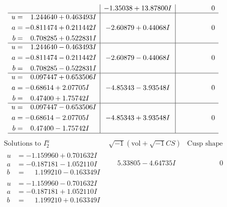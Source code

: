 \documentclass[1p]{elsarticle_modified}
\theoremstyle{definition}
\newcommand{\I}{\sqrt{-1}}
\begin{document}
$$\begin{array}{c|c|c}
 & -1.35038 + 13.87800 I & \phantom{-0.000000 } 0 \\ \hline\begin{aligned}
u &= \phantom{-}1.244640 + 0.463493 I \\
a &= -0.811474 + 0.211442 I \\
b &= \phantom{-}0.708285 + 0.522831 I\end{aligned}
 & -2.60879 + 0.44068 I & \phantom{-0.000000 } 0 \\ \hline\begin{aligned}
u &= \phantom{-}1.244640 - 0.463493 I \\
a &= -0.811474 - 0.211442 I \\
b &= \phantom{-}0.708285 - 0.522831 I\end{aligned}
 & -2.60879 - 0.44068 I & \phantom{-0.000000 } 0 \\ \hline\begin{aligned}
u &= \phantom{-}0.097447 + 0.653506 I \\
a &= -0.68614 + 2.07705 I \\
b &= \phantom{-}0.47400 + 1.75742 I\end{aligned}
 & -4.85343 - 3.93548 I & \phantom{-0.000000 } 0 \\ \hline\begin{aligned}
u &= \phantom{-}0.097447 - 0.653506 I \\
a &= -0.68614 - 2.07705 I \\
b &= \phantom{-}0.47400 - 1.75742 I\end{aligned}
 & -4.85343 + 3.93548 I & \phantom{-0.000000 } 0\\
 \hline 
 \end{array}$$\newpage$$\begin{array}{c|c|c}  
\text{Solutions to }I^u_{2}& \I (\text{vol} + \sqrt{-1}CS) & \text{Cusp shape}\\
 \hline 
\begin{aligned}
u &= -1.159960 + 0.701632 I \\
a &= -0.187181 - 1.052110 I \\
b &= \phantom{-}1.199210 - 0.163349 I\end{aligned}
 & \phantom{-}5.33805 - 4.64735 I & \phantom{-0.000000 } 0 \\ \hline\begin{aligned}
u &= -1.159960 - 0.701632 I \\
a &= -0.187181 + 1.052110 I \\
b &= \phantom{-}1.199210 + 0.163349 I\end{aligned}

\end{array}$$
\end{document}
